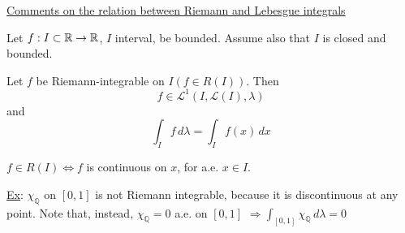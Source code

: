 \underline{Comments on the relation between Riemann and Lebesgue integrals}

Let \(f : I \subset \mathbb{R} \to \mathbb{R}\), \(I\) interval, be bounded. Assume also that \(I\) is closed and bounded.
\begin{theorem}
    Let \(f\) be Riemann-integrable on \(I(f \in R(I))\). Then 
    \[
        f\in \mathcal{L}^1(I, \mathcal{L}(I), \lambda)
    \]
    and 
    \[
        \int_I f \, d\lambda = \int_I f(x) \, dx
    \]
\end{theorem}
\begin{theorem}
    \(f \in R(I) \Longleftrightarrow f\) is continuous on \(x\), for a.e. \(x \in I\).
\end{theorem}
\underline{Ex}: \(\chi_{\mathbb{Q}}\) on \([0,1]\) is not Riemann integrable, because it is discontinuous at any point. Note that, instead, \(\chi_{\mathbb{Q}} = 0\) a.e. on \([0,1]\) \(\Longrightarrow \int_{[0,1]} \chi_{\mathbb{Q}} \, d\lambda = 0\)